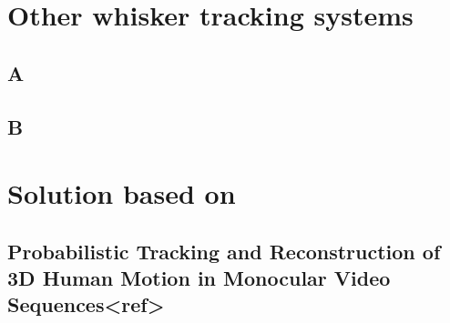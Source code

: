 
\section{Other whisker tracking systems}
    \subsection{A}
    \subsection{B}

\section{Solution based on}
    \subsection{Probabilistic Tracking and Reconstruction of 3D Human Motion in Monocular Video Sequences<ref>}



